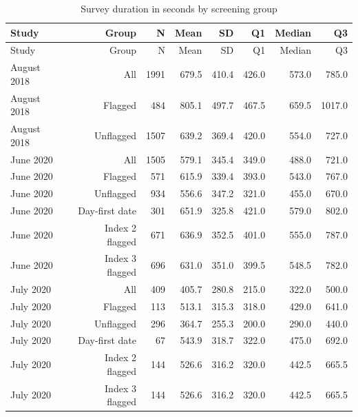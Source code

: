 {\small
\begin{longtable}{lrrrrrrr}
\caption{Survey duration in seconds by screening group}\\
\toprule
Study & Group & N & Mean & SD & Q1 & Median & Q3 \\
\midrule\endfirsthead
\toprule
Study & Group & N & Mean & SD & Q1 & Median & Q3 \\
\midrule\endhead
\bottomrule\endfoot
August 2018 & All & 1991 & 679.5 & 410.4 & 426.0 & 573.0 & 785.0 \\
August 2018 & Flagged & 484 & 805.1 & 497.7 & 467.5 & 659.5 & 1017.0 \\
August 2018 & Unflagged & 1507 & 639.2 & 369.4 & 420.0 & 554.0 & 727.0 \\
June 2020 & All & 1505 & 579.1 & 345.4 & 349.0 & 488.0 & 721.0 \\
June 2020 & Flagged & 571 & 615.9 & 339.4 & 393.0 & 543.0 & 767.0 \\
June 2020 & Unflagged & 934 & 556.6 & 347.2 & 321.0 & 455.0 & 670.0 \\
June 2020 & Day-first date & 301 & 651.9 & 325.8 & 421.0 & 579.0 & 802.0 \\
June 2020 & Index 2 flagged & 671 & 636.9 & 352.5 & 401.0 & 555.0 & 787.0 \\
June 2020 & Index 3 flagged & 696 & 631.0 & 351.0 & 399.5 & 548.5 & 782.0 \\
July 2020 & All & 409 & 405.7 & 280.8 & 215.0 & 322.0 & 500.0 \\
July 2020 & Flagged & 113 & 513.1 & 315.3 & 318.0 & 429.0 & 641.0 \\
July 2020 & Unflagged & 296 & 364.7 & 255.3 & 200.0 & 290.0 & 440.0 \\
July 2020 & Day-first date & 67 & 543.9 & 318.7 & 322.0 & 475.0 & 692.0 \\
July 2020 & Index 2 flagged & 144 & 526.6 & 316.2 & 320.0 & 442.5 & 665.5 \\
July 2020 & Index 3 flagged & 144 & 526.6 & 316.2 & 320.0 & 442.5 & 665.5 \\
\end{longtable}}

